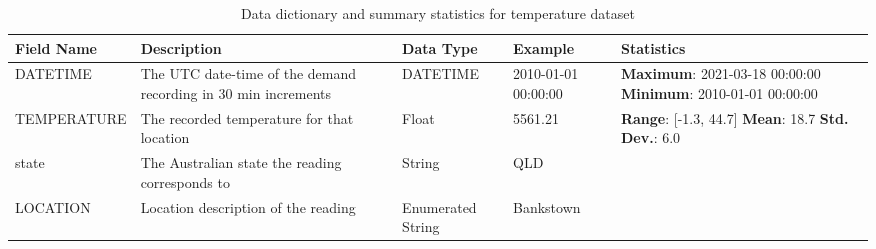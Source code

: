 \begin{table}
\centering
\setlength{\tabcolsep}{4pt} %
\renewcommand{\arraystretch}{1.5}  %
\small %
\begin{tabular}{@{}lp{6.3cm}llp{6.2cm}@{}} %
\toprule
Field Name & Description & Data Type & Example & Statistics \\
\midrule
DATETIME & The UTC date-time of the demand recording in 30 min increments & DATETIME & 2010-01-01 00:00:00& 
\textbf{Maximum}: 2021-03-18 00:00:00\newline
\textbf{Minimum}: 2010-01-01 00:00:00 \\

TEMPERATURE & The recorded temperature for that location & Float & 5561.21 & 
\textbf{Range}: [-1.3, 44.7]\newline
\textbf{Mean}: 18.7\newline
\textbf{Std. Dev.}: 6.0 \\

state & The Australian state the reading corresponds to & String & QLD & \\

LOCATION & Location description of the reading & Enumerated String & Bankstown & \\

\bottomrule
\end{tabular}
\caption{Data dictionary and summary statistics for temperature dataset}
\label{temp-dict}
\end{table}